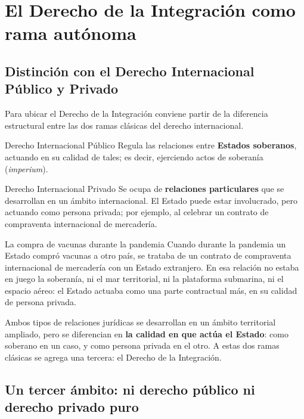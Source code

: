\documentclass[12pt,oneside]{book}
\begin{document}
\chapter{El Derecho de la Integración como rama autónoma}

\section{Distinción con el Derecho Internacional Público y Privado}

Para ubicar el Derecho de la Integración conviene partir de la diferencia estructural entre las dos ramas clásicas del derecho internacional.

\begin{definition}{Derecho Internacional Público}
Regula las relaciones entre \textbf{Estados soberanos}, actuando en su calidad de tales; es decir, ejerciendo actos de soberanía (\emph{imperium}).
\end{definition}

\begin{definition}{Derecho Internacional Privado}
Se ocupa de \textbf{relaciones particulares} que se desarrollan en un ámbito internacional. El Estado puede estar involucrado, pero actuando como persona privada; por ejemplo, al celebrar un contrato de compraventa internacional de mercadería.
\end{definition}

\begin{example}{La compra de vacunas durante la pandemia}
Cuando durante la pandemia un Estado compró vacunas a otro país, se trataba de un contrato de compraventa internacional de mercadería con un Estado extranjero. En esa relación no estaba en juego la soberanía, ni el mar territorial, ni la plataforma submarina, ni el espacio aéreo: el Estado actuaba como una parte contractual más, en su calidad de persona privada.
\end{example}

Ambos tipos de relaciones jurídicas se desarrollan en un ámbito territorial ampliado, pero se diferencian en \textbf{la calidad en que actúa el Estado}: como soberano en un caso, y como persona privada en el otro. A estas dos ramas clásicas se agrega una tercera: el Derecho de la Integración.

\section{Un tercer ámbito: ni derecho público ni derecho privado puro}
\end{document}
